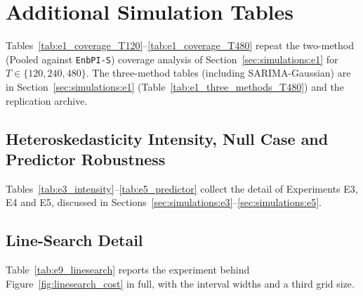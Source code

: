 \section{Additional Simulation Tables}
\label{app:additional}

Tables~\ref{tab:e1_coverage_T120}--\ref{tab:e1_coverage_T480}
repeat the two-method (Pooled against \texttt{EnbPI-S}) coverage
analysis of Section~\ref{sec:simulations:e1} for
$T \in \{120, 240, 480\}$.
The three-method tables (including SARIMA-Gaussian) are
in Section~\ref{sec:simulations:e1}
(Table~\ref{tab:e1_three_methods_T480}) and the
replication archive.







\subsection{Heteroskedasticity Intensity, Null Case and Predictor
            Robustness}
\label{app:e3e5}

Tables~\ref{tab:e3_intensity}--\ref{tab:e5_predictor} collect the
detail of Experiments E3, E4 and E5, discussed in
Sections~\ref{sec:simulations:e3}--\ref{sec:simulations:e5}.







\subsection{Line-Search Detail}
\label{app:linesearch}

Table~\ref{tab:e9_linesearch} reports the experiment behind
Figure~\ref{fig:linesearch_cost} in full, with the interval widths and a
third grid size.


